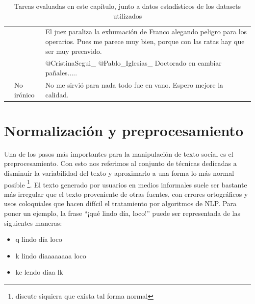 \begin{table}
\begin{tabularx}{\textwidth}{l l X}
                                       &                & El juez paraliza la exhumación de Franco alegando peligro para los operarios. Pues me parece muy bien, porque con las ratas hay que ser muy precavido.	\\
                                       &                & $@$CristinaSegui\_ $@$Pablo\_Iglesias\_ Doctorado en cambiar pañales.....	\\
                                       & No irónico     & No me sirvió para nada todo fue en vano. Espero mejore la calidad.	\\
    \end{tabularx}
    \caption{Tareas evaluadas en este capítulo, junto a datos estadísticos de los datasets utilizados}
    \label{tab:03_datasets_examples}
\end{table}



\section{Normalización y preprocesamiento}
\label{sec:03_preprocessing}

Una de los pasos más importantes para la manipulación de texto social es el preprocesamiento. Con esto nos referimos al conjunto de técnicas dedicadas a disminuir la variabilidad del texto y aproximarlo a una forma lo más normal posible \footnote{\citet{eisenstein2013bad} discute siquiera que exista tal forma normal}. El texto generado por usuarios en medios informales suele ser bastante más irregular que el texto proveniente de otras fuentes, con errores ortográficos y usos coloquiales que hacen difícil el tratamiento por algoritmos de NLP. Para poner un ejemplo, la frase ``¡qué lindo día, loco!'' puede ser representada de las siguientes maneras:

\begin{itemize}
    \item q lindo día loco
    \item k lindo diaaaaaaaa loco
    \item ke lendo diaa lk
\end{itemize}


